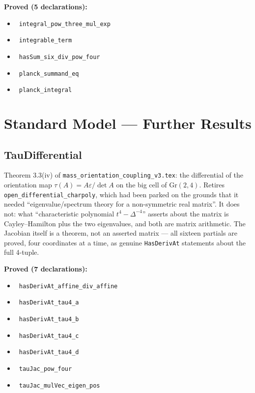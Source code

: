 \documentclass{report}
\theoremstyle{definition}
\begin{document}
\begin{itemize}
\begin{itemize}
\noindent\textbf{Proved (5 declarations):}
\begin{itemize}
  \item {}\leanok\ \texttt{integral\_pow\_three\_mul\_exp}
  \item {}\leanok\ \texttt{integrable\_term}
  \item {}\leanok\ \texttt{hasSum\_six\_div\_pow\_four}
  \item {}\leanok\ \texttt{planck\_summand\_eq}
  \item {}\leanok\ \texttt{planck\_integral}
\end{itemize}

\section{Standard Model --- Further Results}

\subsection{TauDifferential}
Theorem 3.3(iv) of \texttt{mass\_orientation\_coupling\_v3.tex}: the differential of the
orientation map $\tau(A)=A\varepsilon/\det A$ on the big cell of $\mathrm{Gr}(2,4)$. Retires
\texttt{open\_differential\_charpoly}, which had been parked on the grounds that it needed
``eigenvalue/spectrum theory for a non-symmetric real matrix''. It does not: what
``characteristic polynomial $t^4-\Delta^{-4}$'' asserts about the matrix is Cayley--Hamilton
plus the two eigenvalues, and both are matrix arithmetic. The Jacobian itself is a theorem,
not an asserted matrix --- all sixteen partials are proved, four coordinates at a time, as
genuine \texttt{HasDerivAt} statements about the full 4-tuple.

\noindent\textbf{Proved (7 declarations):}
\begin{itemize}
  \item {}\leanok\ \texttt{hasDerivAt\_affine\_div\_affine}
  \item {}\leanok\ \texttt{hasDerivAt\_tau4\_a}
  \item {}\leanok\ \texttt{hasDerivAt\_tau4\_b}
  \item {}\leanok\ \texttt{hasDerivAt\_tau4\_c}
  \item {}\leanok\ \texttt{hasDerivAt\_tau4\_d}
  \item {}\leanok\ \texttt{tauJac\_pow\_four}
  \item {}\leanok\ \texttt{tauJac\_mulVec\_eigen\_pos}
\end{itemize}


\end{itemize}
\end{itemize}
\end{document}
